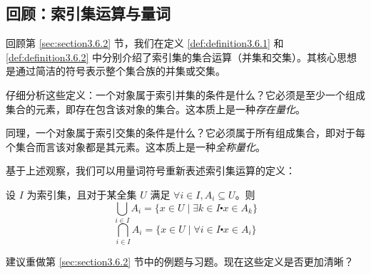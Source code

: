 \subsection{回顾：索引集运算与量词}

回顾第 \ref{sec:section3.6.2} 节，我们在定义 \ref{def:definition3.6.1} 和 \ref{def:definition3.6.2} 中分别介绍了索引集的集合运算（并集和交集）。其核心思想是通过简洁的符号表示整个集合族的并集或交集。

仔细分析这些定义：一个对象属于索引并集的条件是什么？它必须是至少一个组成集合的元素，即存在包含该对象的集合。这本质上是一种\emph{存在量化}。

同理，一个对象属于索引交集的条件是什么？它必须属于所有组成集合，即对于每个集合而言该对象都是其元素。这本质上是一种\emph{全称量化}。

基于上述观察，我们可以用量词符号重新表述索引集运算的定义：

\begin{definition}
    设 $I$ 为索引集，且对于某全集 $U$ 满足 $\forall i \in I, A_i \subseteq U$。则
    \[\bigcup_{i \in I} A_i = \{x \in U \mid \exists k \in I \centerdot x \in A_k\}\]
    \[\bigcap_{i \in I} A_i = \{x \in U \mid \forall i \in I \centerdot x \in A_i\}\]
\end{definition}

建议重做第 \ref{sec:section3.6.2} 节中的例题与习题。现在这些定义是否更加清晰？
